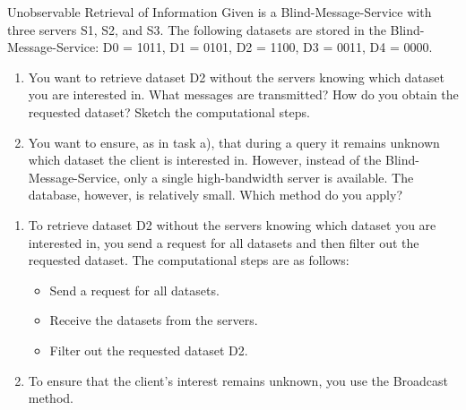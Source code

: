\documentclass{article}
\begin{document}
\begin{exercise}{Unobservable Retrieval of Information}
  Given is a Blind-Message-Service with three servers S1, S2, and S3. The following datasets are stored in the Blind-Message-Service: D0 = 1011, D1 = 0101, D2 = 1100, D3 = 0011, D4 = 0000.
  \begin{enumerate}
    \item You want to retrieve dataset D2 without the servers knowing which dataset you are interested in. What messages are transmitted? How do you obtain the requested dataset? Sketch the computational steps.
    \item You want to ensure, as in task a), that during a query it remains unknown which dataset the client is interested in. However, instead of the Blind-Message-Service, only a single high-bandwidth server is available. The database, however, is relatively small. Which method do you apply?
  \end{enumerate}

  \begin{solution}
    \begin{enumerate}
      \item To retrieve dataset D2 without the servers knowing which dataset you are interested in, you send a request for all datasets and then filter out the requested dataset. The computational steps are as follows:
        \begin{itemize}
          \item Send a request for all datasets.
          \item Receive the datasets from the servers.
          \item Filter out the requested dataset D2.
        \end{itemize}
      \item To ensure that the client's interest remains unknown, you use the Broadcast method.
    \end{enumerate}
  \end{solution}
\end{exercise}
\end{document}
